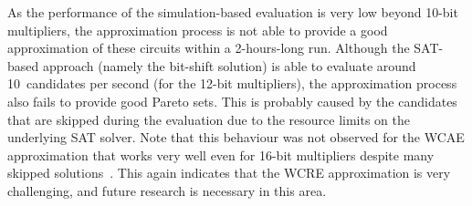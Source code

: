 \documentclass[runningheads]{llncs}
\begin{document}
As the performance of the simulation-based evaluation is very low beyond 10-bit
multipliers, the approximation process is not able to provide a good
approximation of these circuits within a 2-hours-long run. Although the
SAT-based approach (namely the bit-shift solution) is able to evaluate around
10~candidates per second (for the 12-bit multipliers), the approximation process
also fails to provide good Pareto sets. This is probably caused by the
candidates that are skipped during the evaluation due to the resource limits on
the underlying SAT solver. Note that this behaviour was not observed for the
WCAE approximation that works very well even for 16-bit multipliers despite many
skipped solutions~\cite{iccad17}. This again indicates that the WCRE
approximation is very challenging, and future research is necessary in this
area.


%




%
%





\end{document}
